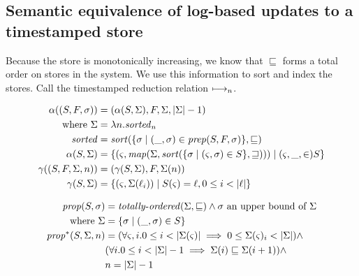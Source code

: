 \documentclass{llncs}
\newcommand{\prop}{\mathit{prop}}
\newcommand{\setof}[1]{\{ #1 \}}
\begin{document}
\subsection{Semantic equivalence of log-based updates to a timestamped store}

Because the store is monotonically increasing, we know that
$\sqsubseteq$ forms a total order on stores in the system. We use this
information to sort and index the stores. Call the timestamped reduction relation $\mathbin{\longmapsto_n}$.

\begin{align*}
\alpha((S,F,\msto)) &= (\alpha(S,\Sigma), F, \Sigma, |\Sigma|-1) \\
\text{ where } \Sigma &= \lambda n. \sorted_n \\
               \sorted &= \sort(\setof{\msto \mid \ttuple{\_}{\msto} \in \prep(S,F,\msto)},\sqsubseteq) \\
\alpha(S,\Sigma) &=
   \setof{\ttuple{\mstate}
                 {\map(\Sigma,\sort(\setof{\msto \mid \ttuple{\mstate}{\msto} \in S}, \sqsupseteq))}
           \mid \ttuple{\mstate,\_} \in S} \\
\gamma((S,F,\Sigma,n)) &= (\gamma(S,\Sigma), F, \Sigma(n)) \\
\gamma(S,\Sigma) &= \setof{\ttuple{\mstate}{\Sigma(\ell_i)} \mid S(\mstate) = \ell, 0 \le i < |\ell|}
\end{align*}



\begin{align*}
\prop(S,\msto) &= \mathit{totally\text{-}ordered}(\Sigma, \sqsubseteq) \wedge \msto \text{ an upper bound of } \Sigma \\
 \text{ where } \Sigma &= \setof{\msto \mid (\_,\msto) \in S} \\
\prop^*(S,\Sigma,n) &= (\forall \mstate, i. 0 \le i < |\Sigma(\mstate)| \implies 0 \le \Sigma(\mstate)_i < |\Sigma|) \wedge \\
                  &(\forall i. 0 \le i < |\Sigma|-1 \implies \Sigma(i) \sqsubseteq \Sigma(i+1)) \wedge \\
                  &n = |\Sigma| - 1
\end{align*}
\end{document}
